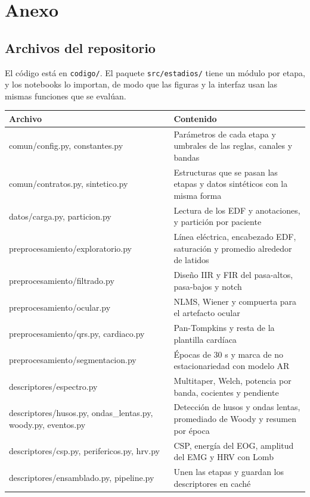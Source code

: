 \clearpage
\appendix
\section{Anexo}

\subsection{Archivos del repositorio}
\label{sec:archivos}
El código está en \texttt{codigo/}. El paquete \texttt{src/estadios/} tiene un módulo por etapa, y los notebooks lo importan, de modo que las figuras y la interfaz usan las mismas funciones que se evalúan.

{\small\noindent
\begin{tabularx}{\textwidth}{>{\ttfamily\raggedright\arraybackslash}p{}X}
  \toprule
  \normalfont Archivo & Contenido \\
  \midrule
  comun/config.py, constantes.py & Parámetros de cada etapa y umbrales de las reglas, canales y bandas \\
  comun/contratos.py, sintetico.py & Estructuras que se pasan las etapas y datos sintéticos con la misma forma \\
  datos/carga.py, particion.py & Lectura de los EDF y anotaciones, y partición por paciente \\
  preprocesamiento/exploratorio.py & Línea eléctrica, encabezado EDF, saturación y promedio alrededor de latidos \\
  preprocesamiento/filtrado.py & Diseño IIR y FIR del pasa-altos, pasa-bajos y notch \\
  preprocesamiento/ocular.py & NLMS, Wiener y compuerta para el artefacto ocular \\
  preprocesamiento/qrs.py, cardiaco.py & Pan-Tompkins y resta de la plantilla cardíaca \\
  preprocesamiento/segmentacion.py & Épocas de 30 s y marca de no estacionariedad con modelo AR \\
  descriptores/espectro.py & Multitaper, Welch, potencia por banda, cocientes y pendiente \\
  descriptores/husos.py, ondas\_lentas.py, woody.py, eventos.py & Detección de husos y ondas lentas, promediado de Woody y resumen por época \\
  descriptores/csp.py, perifericos.py, hrv.py & CSP, energía del EOG, amplitud del EMG y HRV con Lomb \\
  descriptores/ensamblado.py, pipeline.py & Unen las etapas y guardan los descriptores en caché \\

\end{tabularx}}
